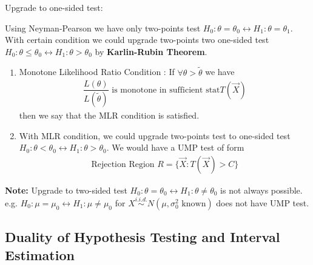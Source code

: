     \begin{point}
        Upgrade to one-sided test:
    \end{point}
    
    Using Neyman-Pearson we have only two-points test $ H_0:\theta =\theta _0 \longleftrightarrow H_1:\theta =\theta _1 $. With certain condition we could upgrade two-points two one-sided test $ H_0:\theta \leq \theta _0 \longleftrightarrow H_1:\theta >\theta _0 $ by \textbf{Karlin-Rubin Theorem}. 

    \begin{enumerate}[topsep=2pt,itemsep=0pt]
        \item Monotone Likelihood Ratio Condition : If $ \forall \theta > \tilde{\theta } $ we have
        \begin{align*}
            \dfrac{ L(\theta ) }{ L(\tilde{\theta }) } \text{ is monotone in sufficient stat} T(\vec{X})  
        \end{align*}
        then we say that the MLR condition is satisfied.
        \item With MLR condition, we could upgrade two-points test to one-sided test $ H_0: \theta <\theta _0 \longleftrightarrow H_1:\theta >\theta _0 $. We would have a UMP test of form 
        \begin{align*}
            \text{Rejection Region }R=\{ \vec{X}:T(\vec{X})>C \} 
        \end{align*}
    
    \end{enumerate}

    \textbf{Note:} Upgrade to two-sided test $ H_0:\theta =\theta _0 \longleftrightarrow H_1:\theta \neq \theta _0 $ is not always possible. e.g. $ H_0:\mu =\mu _0 \longleftrightarrow H_1:\mu \neq \mu _0 $ for $ X\mathop{ \sim  }\limits^{i.i.d.} N(\mu ,\sigma_0^2 \text{ known})  $ does not have UMP test.
    
        

\subsection{Duality of Hypothesis Testing and Interval Estimation}

